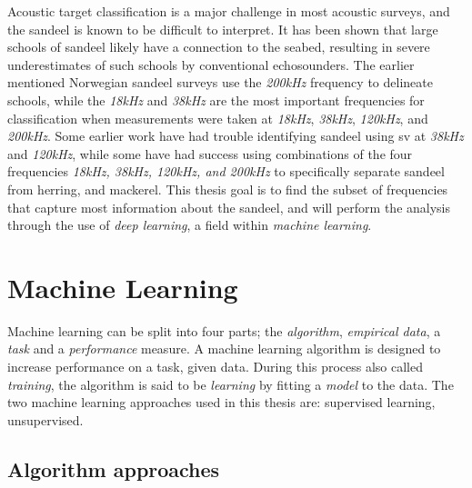 Acoustic target classification is a major challenge in most acoustic surveys, and the sandeel is known to be difficult to interpret\cite{sizedependentfreqrespons2009johnsen}. It has been shown that large schools of sandeel likely have a connection to the seabed, resulting in severe underestimates of such schools by conventional echosounders\cite{johnsen2017collective}. The earlier mentioned Norwegian sandeel surveys use the \textit{200kHz} frequency to delineate schools, while the \textit{18kHz} and \textit{38kHz} are the most important frequencies for classification when measurements were taken at \textit{18kHz}, \textit{38kHz}, \textit{120kHz}, and \textit{200kHz}\cite{sizedependentfreqrespons2009johnsen}. Some earlier work have had trouble identifying sandeel using \gls{sv} at \textit{38kHz} and \textit{120kHz}\cite{hassel2004influence,mackinson2005using,mosteiro2004dual}, while some have had success using combinations of the four frequencies \textit{18kHz, 38kHz, 120kHz, and 200kHz} to specifically separate sandeel from herring, and mackerel\cite{mohammed2006acoustic}. This thesis goal is to find the subset of frequencies that capture most information about the sandeel, and will perform the analysis through the use of \textit{deep learning}, a field within \textit{machine learning}.




\section{Machine Learning} \label{Machine Learning}
    Machine learning can be split into four parts; the \textit{algorithm}, \textit{empirical data}, a \textit{task} and a \textit{performance} measure\cite{Goodfellow-et-al-2016_ML}. A machine learning algorithm is designed to increase performance on a task, given data. During this process also called \textit{training}, the algorithm is said to be \textit{learning} by fitting a \textit{model} to the data. The two machine learning approaches used in this thesis are: supervised learning, unsupervised\cite{Goodfellow-et-al-2016_E}. 
    
    
    \subsection{Algorithm approaches} \label{Algorithm types}
